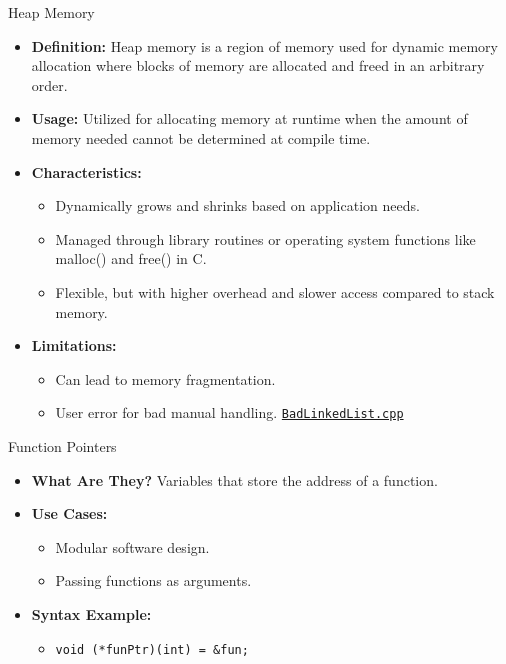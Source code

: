 \documentclass[10pt]{beamer}
\begin{document}
\begin{frame}{Heap Memory}
  \begin{itemize}
    \item \textbf{Definition:} Heap memory is a region of memory used for dynamic memory allocation where blocks of memory are allocated and freed in an arbitrary order.
    \item \textbf{Usage:} Utilized for allocating memory at runtime when the amount of memory needed cannot be determined at compile time.
    \item \textbf{Characteristics:}
      \begin{itemize}
        \item Dynamically grows and shrinks based on application needs.
        \item Managed through library routines or operating system functions like malloc() and free() in C.
        \item Flexible, but with higher overhead and slower access compared to stack memory.
      \end{itemize}
    \item \textbf{Limitations:}
      \begin{itemize}
        \item Can lead to memory fragmentation.
        \item User error for bad manual handling. \href{run:./BadLinkedList.cpp}{\texttt{BadLinkedList.cpp}}
      \end{itemize}
  \end{itemize}
\end{frame}

\begin{frame}{Function Pointers}
  \begin{itemize}
    \item \textbf{What Are They?} Variables that store the address of a function.
    \item \textbf{Use Cases:}
      \begin{itemize}
        \item Modular software design.
        \item Passing functions as arguments.
      \end{itemize}
    \item \textbf{Syntax Example:}
      \begin{itemize}
        \item \texttt{void (*funPtr)(int) = \&fun;}
      \end{itemize}
  \end{itemize}
\end{frame}
\end{document}
